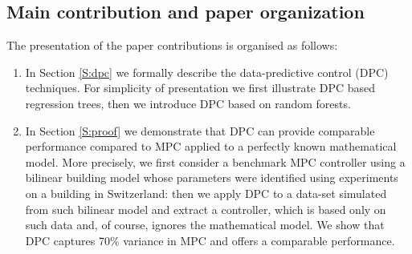 \textcolor[rgb]{0,0,1}{
\subsection{Main contribution and paper organization}
The presentation of the paper contributions is organised as follows:
\begin{enumerate}
	\item In Section \ref{S:dpc} we formally describe the data-predictive control (DPC) techniques. For simplicity of presentation we first illustrate DPC based regression trees, then we introduce DPC based on random forests.
	\item In Section \ref{S:proof} we demonstrate that DPC can provide comparable performance compared to MPC applied to a perfectly known mathematical model. More precisely, we first consider a benchmark MPC controller using a bilinear building model whose parameters were identified using experiments on a building in Switzerland: then we apply DPC to a data-set simulated from such bilinear model and extract a controller, which is based only on such data and, of course, ignores the mathematical model. We show that DPC captures 70\% variance in MPC and offers a comparable performance.

\end{enumerate}}
